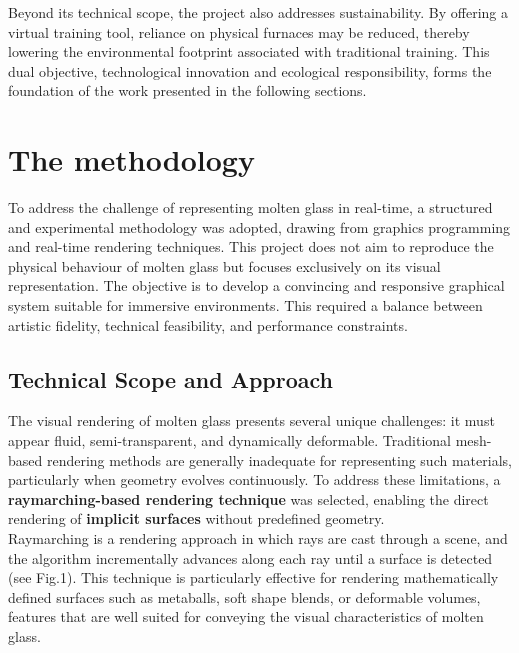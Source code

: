 \documentclass{rapportcs}
\begin{document}
\noindent Beyond its technical scope, the project also addresses sustainability. By offering a virtual training tool, reliance on physical furnaces may be reduced, thereby lowering the environmental footprint associated with traditional training. This dual objective, technological innovation and ecological responsibility, forms the foundation of the work presented in the following sections.

\newpage


\section{The methodology}

To address the challenge of representing molten glass in real-time, a structured and experimental methodology was adopted, drawing from graphics programming and real-time rendering techniques. This project does not aim to reproduce the physical behaviour of molten glass but focuses exclusively on its visual representation. The objective is to develop a convincing and responsive graphical system suitable for immersive environments. This required a balance between artistic fidelity, technical feasibility, and performance constraints.

\subsection{Technical Scope and Approach}

    The visual rendering of molten glass presents several unique challenges: it must appear fluid, semi-transparent, and dynamically deformable. Traditional mesh-based rendering methods are generally inadequate for representing such materials, particularly when geometry evolves continuously. To address these limitations, a \textbf{raymarching-based rendering technique} was selected, enabling the direct rendering of \textbf{implicit surfaces} without predefined geometry. \\
    
    \noindent Raymarching is a rendering approach in which rays are cast through a scene, and the algorithm incrementally advances along each ray until a surface is detected (see Fig.1). This technique is particularly effective for rendering mathematically defined surfaces such as metaballs, soft shape blends, or deformable volumes, features that are well suited for conveying the visual characteristics of molten glass.
\end{document}
